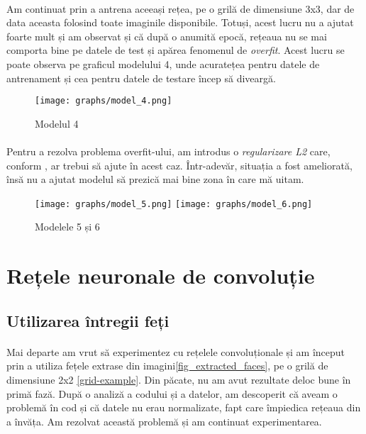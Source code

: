 \paragraph{}
Am continuat prin a antrena aceeași rețea, pe o grilă de dimensiune 3x3, dar de data aceasta folosind toate imaginile disponibile.
Totuși, acest lucru nu a ajutat foarte mult și am observat și că după o anumită epocă, rețeaua nu se mai comporta bine pe datele de test și apărea fenomenul de \emph{overfit}.
Acest lucru se poate observa pe graficul modelului 4, unde acuratețea pentru datele de antrenament și cea pentru datele de testare încep să diveargă.

\begin{figure}[h]
    \centering
    \texttt{[image: graphs/model\_4.png]}
    \caption{Modelul 4}
\end{figure}

\paragraph{}
Pentru a rezolva problema overfit-ului, am introdus o \emph{regularizare L2} care, conform \cite{l1_l2_regularisation}, ar trebui să ajute în acest caz.
Într-adevăr, situația a fost ameliorată, însă nu a ajutat modelul să prezică mai bine zona în care mă uitam.

\begin{figure}[h]
    \centering
    \texttt{[image: graphs/model\_5.png]}
    \texttt{[image: graphs/model\_6.png]}
    \caption{Modelele 5 și 6}
\end{figure}


\section{Rețele neuronale de convoluție}
\subsection{Utilizarea întregii feți}
\paragraph{}
Mai departe am vrut să experimentez cu rețelele convoluționale și am început prin a utiliza fețele extrase din imagini\ref{fig_extracted_faces}, pe o grilă de dimensiune 2x2 \ref{grid-example}.
Din păcate, nu am avut rezultate deloc bune în primă fază.
După o analiză a codului și a datelor, am descoperit că aveam o problemă în cod și că datele nu erau normalizate, fapt care împiedica rețeaua din a învăța.
Am rezolvat această problemă și am continuat experimentarea.

